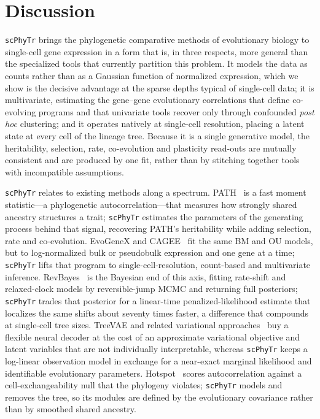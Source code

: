 \documentclass{article}
\newcommand{\scphytr}{\texttt{scPhyTr}}
\begin{document}
\section*{Discussion}
\label{sec:discussion}

\scphytr{} brings the phylogenetic comparative methods of evolutionary biology to
single-cell gene expression in a form that is, in three respects, more general than the
specialized tools that currently partition this problem. It models the data as counts
rather than as a Gaussian function of normalized expression, which we show is the
decisive advantage at the sparse depths typical of single-cell data; it is multivariate,
estimating the gene--gene evolutionary correlations that define co-evolving programs and
that univariate tools recover only through confounded \emph{post hoc} clustering; and it
operates natively at single-cell resolution, placing a latent state at every cell of the
lineage tree. Because it is a single generative model, the heritability, selection, rate,
co-evolution and plasticity read-outs are mutually consistent and are produced by one fit,
rather than by stitching together tools with incompatible assumptions.

\scphytr{} relates to existing methods along a spectrum. PATH~\cite{schiffman_path_2024}
is a fast moment statistic---a phylogenetic autocorrelation---that measures how strongly
shared ancestry structures a trait; \scphytr{} estimates the parameters of the generating
process behind that signal, recovering PATH's heritability while adding selection, rate and
co-evolution. EvoGeneX and CAGEE~\cite{hirsch_emt_2025, mendes_cagee_2023} fit the same BM
and OU models, but to log-normalized bulk or pseudobulk expression and one gene at a time;
\scphytr{} lifts that program to single-cell-resolution, count-based and multivariate
inference. RevBayes~\cite{hohna_revbayes_2016} is the Bayesian end of this axis, fitting
rate-shift and relaxed-clock models by reversible-jump MCMC and returning full posteriors;
\scphytr{} trades that posterior for a linear-time penalized-likelihood estimate that
localizes the same shifts about seventy times faster, a difference that compounds at
single-cell tree sizes. TreeVAE and related variational approaches~\cite{lopez_treevae_2021} buy a
flexible neural decoder at the cost of an approximate variational objective and latent
variables that are not individually interpretable, whereas \scphytr{} keeps a log-linear
observation model in exchange for a near-exact marginal likelihood and identifiable
evolutionary parameters. Hotspot~\cite{detomaso_hotspot_2021} scores autocorrelation
against a cell-exchangeability null that the phylogeny violates; \scphytr{} models and
removes the tree, so its modules are defined by the evolutionary covariance rather than by
smoothed shared ancestry.
\end{document}
